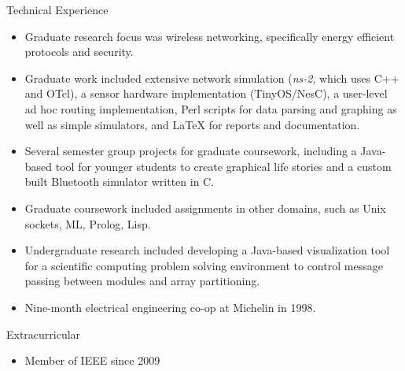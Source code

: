 \documentclass[10pt]{article}
\begin{document}
\begin{cv}
\begin{cvlist}{Technical Experience}
\item
\begin{itemize}\itemsep=0.25em
	\item Graduate research focus was wireless networking, specifically
	energy efficient protocols and security.
	\item Graduate work included extensive network simulation
	(\emph{ns-2}, which uses C++ and OTcl), 
	a sensor hardware implementation (TinyOS/NesC),
	a user-level ad hoc routing implementation, Perl scripts for
	data parsing and graphing as well as simple simulators, and LaTeX
	for reports and documentation.
	\item Several semester group projects for graduate coursework,
	including a Java-based tool for younger students to create graphical
	life stories and a custom built Bluetooth simulator written in C.
	\item Graduate coursework included assignments in
	other domains, such as Unix sockets, ML, Prolog, Lisp.
	\item Undergraduate research included developing a Java-based
	visualization tool for a scientific computing problem solving
	environment to control message passing between modules and array
	partitioning.
	\item Nine-month electrical engineering co-op at Michelin in 1998.
\end{itemize}
\end{cvlist}

\begin{cvlist}{Extracurricular}
\item
\begin{itemize}\itemsep=0.25em
	\item Member of IEEE since 2009
\end{itemize}
\end{cvlist}

\setlength{\cvlabelwidth}{\oldcvlabelwidth}
\setlength{\cvlabelsep}{\oldcvlabelsep}

\end{cv}
\end{document}

